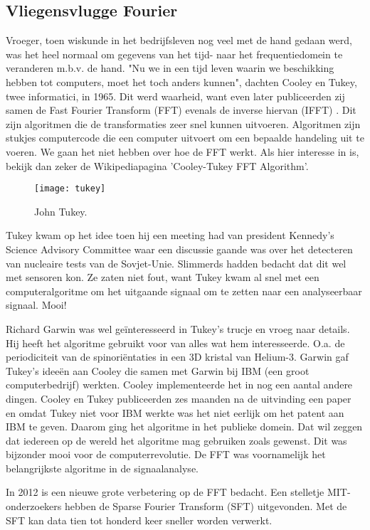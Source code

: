 \documentclass[11pt,fleqn]{book} %
\begin{document}
\subsection{Vliegensvlugge Fourier}
Vroeger, toen wiskunde in het bedrijfsleven nog veel met de hand gedaan werd, was het heel normaal om gegevens van het tijd- naar het frequentiedomein te veranderen m.b.v. de hand. "Nu we in een tijd leven waarin we beschikking hebben tot computers, moet het toch anders kunnen", dachten Cooley en Tukey, twee informatici, in 1965. Dit werd waarheid, want even later publiceerden zij samen de Fast Fourier Transform (FFT) evenals de inverse hiervan (IFFT) \cite{fft}. Dit zijn algoritmen die de transformaties zeer snel kunnen uitvoeren. Algoritmen zijn stukjes computercode die een computer uitvoert om een bepaalde handeling uit te voeren. We gaan het niet hebben over hoe de FFT werkt. Als hier interesse in is, bekijk dan zeker de Wikipediapagina 'Cooley-Tukey FFT Algorithm'.

\begin{figure}[h]
	\centering\texttt{[image: tukey]}
	\caption{John Tukey.}
	\label{fig:tukey}
\end{figure}

Tukey kwam op het idee toen hij een meeting had van president Kennedy’s Science Advisory Committee waar een discussie gaande was over het detecteren van nucleaire tests van de Sovjet-Unie. Slimmerds hadden bedacht dat dit wel met sensoren kon. Ze zaten niet fout, want Tukey kwam al snel met een computeralgoritme om het uitgaande signaal om te zetten naar een analyseerbaar signaal. Mooi!

Richard Garwin was wel geïnteresseerd in Tukey’s trucje en vroeg naar details. Hij heeft het algoritme gebruikt voor van alles wat hem interesseerde. O.a. de periodiciteit van de spinoriëntaties in een 3D kristal van Helium-3. Garwin gaf Tukey’s ideeën aan Cooley die samen met Garwin bij IBM (een groot computerbedrijf) werkten. Cooley implementeerde het in nog een aantal andere dingen. Cooley en Tukey publiceerden zes maanden na de uitvinding een paper en omdat Tukey niet voor IBM werkte was het niet eerlijk om het patent aan IBM te geven. Daarom ging het algoritme in het publieke domein. Dat wil zeggen dat iedereen op de wereld het algoritme mag gebruiken zoals gewenst. Dit was bijzonder mooi voor de computerrevolutie. De FFT was voornamelijk het belangrijkste algoritme in de signaalanalyse.

In 2012 is een nieuwe grote verbetering op de FFT bedacht. Een stelletje MIT-onderzoekers hebben de Sparse Fourier Transform (SFT) uitgevonden. Met de SFT kan data tien tot honderd keer sneller worden verwerkt.
\end{document}
